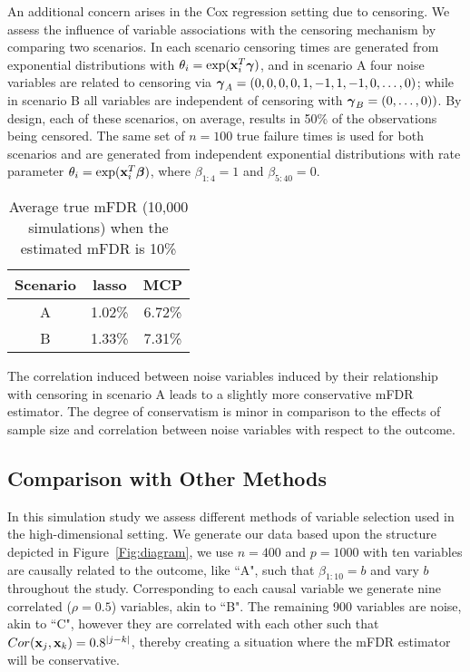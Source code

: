 An additional concern arises in the Cox regression setting due to censoring.  We assess the influence of variable associations with the censoring mechanism by comparing two scenarios. In each scenario censoring times are generated from exponential distributions with $\theta_{i} = \exp(\mathbf{x}_i^T \boldsymbol{\gamma})$, and in scenario A four noise variables are related to censoring via $\boldsymbol{\gamma}_A = (0, 0, 0, 0, 1, -1, 1, -1, 0, \ldots, 0) $; while in scenario B all variables are independent of censoring with $\boldsymbol{\gamma}_B = (0, \ldots, 0))$. By design, each of these scenarios, on average, results in 50\% of the observations being censored.  The same set of $n = 100$ true failure times is used for both scenarios and are generated from independent exponential distributions with rate parameter $\theta_i = \exp(\mathbf{x}_i^T \boldsymbol{\beta})$, where $\beta_{1:4} = 1$ and $\beta_{5:40} = 0$.
\begin{table}[!htb]
 \caption{Average true mFDR (10,000 simulations) when the estimated mFDR is 10\%}
\centering
\begin{tabular}{c | c c}
  \hline
 Scenario & lasso & MCP   \\  [0.5ex]
  \hline 
   A & 1.02\% & 6.72\% \\ 
   B &  1.33\% & 7.31\% \\ 
   \hline
\end{tabular}
\end{table}

The correlation induced between noise variables induced by their relationship with censoring in scenario A leads to a slightly more conservative mFDR estimator. The degree of conservatism is minor in comparison to the effects of sample size and correlation between noise variables with respect to the outcome.

\subsection{Comparison with Other Methods}

In this simulation study we assess different methods of variable selection used in the high-dimensional setting. We generate our data based upon the structure depicted in Figure~\ref{Fig:diagram}, we use $n = 400$ and $p = 1000$ with ten variables are causally related to the outcome, like ``A", such that $\beta_{1:10} = b$ and vary $b$ throughout the study. Corresponding to each causal variable we generate nine correlated ($\rho = 0.5$) variables, akin to ``B". The remaining 900 variables are noise, akin to ``C", however they are correlated with each other such that $Cor(\mathbf{x}_j,\mathbf{x}_k) = 0.8^{|j - k|}$, thereby creating a situation where the mFDR estimator will be conservative.

